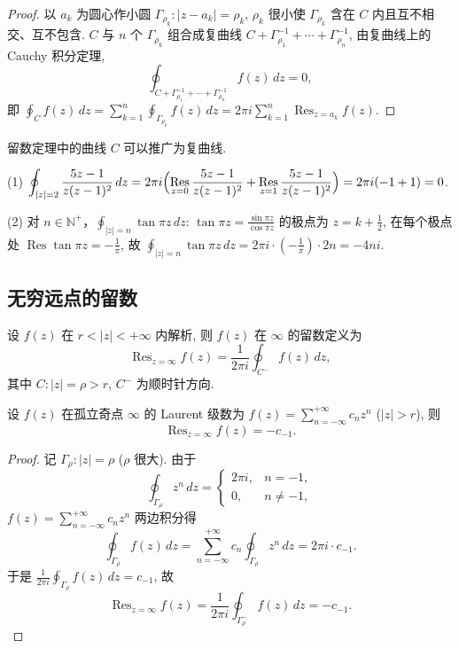 \documentclass[theorem=false,mathfont=none,openany,sub3section]{easybook}
\begin{document}
\begin{proof}
  以 $a_{k}$ 为圆心作小圆 $\Gamma_{\rho_{k}}:|z-a_{k}|=\rho_{k}$, $\rho_{k}$ 很小使 $\Gamma_{\rho_{k}}$ 含在 $C$ 内且互不相交、互不包含. $C$ 与 $n$ 个 $\Gamma_{\rho_{k}}$ 组合成复曲线 $C+\Gamma_{\rho_{1}}^{-1}+\cdots+\Gamma_{\rho_{n}}^{-1}$, 由复曲线上的 Cauchy 积分定理,
  \[
  \oint_{C+\Gamma_{\rho_{1}}^{-1}+\cdots+\Gamma_{\rho_{n}}^{-1}}f(z)\,dz=0,
  \]
  即 $\oint_{C}f(z)\,dz=\sum_{k=1}^{n}\oint_{\Gamma_{\rho_{k}}}f(z)\,dz=2\pi i\sum_{k=1}^{n}\operatorname{Res}_{z=a_{k}}f(z)$.
\end{proof}

\begin{remark}
  留数定理中的曲线 $C$ 可以推广为复曲线.
\end{remark}

\begin{example}
  (1) $\displaystyle\oint_{|z|=2}\frac{5z-1}{z(z-1)^{2}}\,dz=2\pi i\Bigl(\operatorname*{Res}_{z=0}\frac{5z-1}{z(z-1)^{2}}+\operatorname*{Res}_{z=1}\frac{5z-1}{z(z-1)^{2}}\Bigr)=2\pi i(-1+1)=0$.

  (2) 对 $n\in\mathbb N^{+}$，$\displaystyle\oint_{|z|=n}\tan\pi z\,dz$: $\tan\pi z=\frac{\sin\pi z}{\cos\pi z}$ 的极点为 $z=k+\frac{1}{2}$, 在每个极点处 $\operatorname{Res}\tan\pi z=-\frac{1}{\pi}$, 故 $\oint_{|z|=n}\tan\pi z\,dz=2\pi i\cdot(-\frac{1}{\pi})\cdot2n=-4ni$.
\end{example}

\subsection{无穷远点的留数}

\begin{definition}
  设 $f(z)$ 在 $r<|z|<+\infty$ 内解析, 则 $f(z)$ 在 $\infty$ 的留数定义为
  \[
  \operatorname{Res}_{z=\infty}f(z)=\frac{1}{2\pi i}\oint_{C^{-}}f(z)\,dz,
  \]
  其中 $C:|z|=\rho>r$, $C^{-}$ 为顺时针方向.
\end{definition}

\begin{theorem}
  设 $f(z)$ 在孤立奇点 $\infty$ 的 Laurent 级数为 $f(z)=\sum_{n=-\infty}^{+\infty}c_{n}z^{n}$ ($|z|>r$), 则
  \[
  \operatorname{Res}_{z=\infty}f(z)=-c_{-1}.
  \]
\end{theorem}

\begin{proof}
  记 $\Gamma_{\rho}:|z|=\rho$ ($\rho$ 很大). 由于
  \[
  \oint_{\Gamma_{\rho}}z^{n}\,dz=
  \begin{cases}
    2\pi i, & n=-1,\\
    0, & n\neq -1,
  \end{cases}
  \]
  $f(z)=\sum_{n=-\infty}^{+\infty}c_{n}z^{n}$ 两边积分得
  \[
  \oint_{\Gamma_{\rho}}f(z)\,dz=\sum_{n=-\infty}^{+\infty}c_{n}\oint_{\Gamma_{\rho}}z^{n}\,dz=2\pi i\cdot c_{-1}.
  \]
  于是 $\frac{1}{2\pi i}\oint_{\Gamma_{\rho}}f(z)\,dz=c_{-1}$, 故
  \[
  \operatorname{Res}_{z=\infty}f(z)=\frac{1}{2\pi i}\oint_{\Gamma_{\rho}^{-}}f(z)\,dz=-c_{-1}.
  \]
\end{proof}
\end{document}
